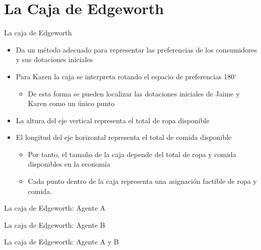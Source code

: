 \section[Caja]{La Caja de Edgeworth}

\begin{frame}{La caja de Edgeworth}
	\begin{itemize}
		\item Da un método adecuado para representar las preferencias de los consumidores y sus dotaciones iniciales
		\item Para Karen la caja se interpreta rotando el espacio de preferencias 180$^{\circ}$
			\begin{itemize}
				\item De esta forma se pueden localizar las dotaciones iniciales de Jaime y Karen como un único punto
			\end{itemize}
		\item La altura del eje vertical representa el total de ropa disponible
		\item El longitud del eje horizontal representa el total de comida disponible
			\begin{itemize}
				\item Por tanto, el tamaño de la caja depende del total de ropa y comida disponibles en la economía
				\item Cada punto dentro de la caja representa una asignación factible de ropa y comida.
			\end{itemize}
	\end{itemize}
\end{frame}
\begin{frame}{La caja de Edgeworth: Agente A}
	
\end{frame}
\begin{frame}{La caja de Edgeworth: Agente B}
		\vspace{3cm}
	
\end{frame}
\begin{frame}{La caja de Edgeworth: Agente A y B}
	
\end{frame}